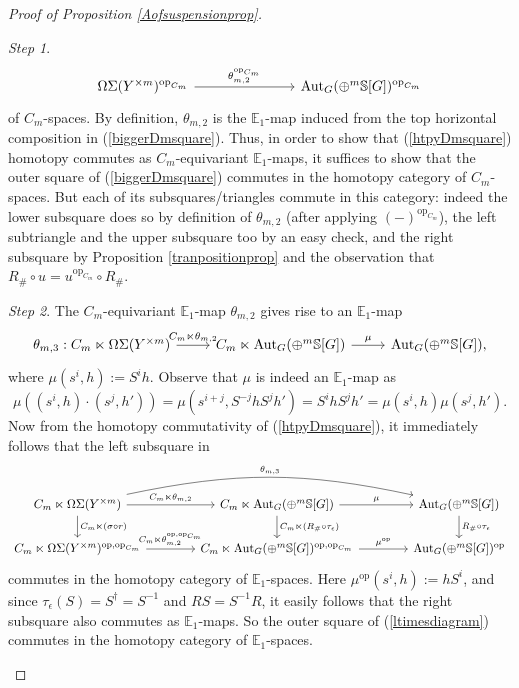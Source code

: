 \documentclass[a4paper, oneside]{amsart}
\newcommand{\1}{\mathds{1}}
\theoremstyle{remark}
\newtheorem{step}{Step}
\theoremstyle{definition}
\newcommand{\s}{\mathbb{S}}
\numberwithin{equation}{section}
\begin{document}
\begin{proof}[Proof of Proposition \ref{Aofsuspensionprop}]
\begin{step}
\begin{equation}
\begin{tikzcd}
\Omega\Sigma(Y^{\times m})^{\mathrm{op}_{C_m}}\ar[rrr, "\theta_{m,2}^{\mathrm{op}_{C_m}}"]&&& \mathrm{Aut}_G(\oplus^m\s[G])^{\mathrm{op}_{C_m}}
\end{tikzcd}
\end{equation}
of $C_m$-spaces. By definition, $\theta_{m,2}$ is the $\mathbb{E}_1$-map induced from the top horizontal composition in (\ref{biggerDmsquare}). Thus, in order to show that (\ref{htpyDmsquare}) homotopy commutes as $C_m$-equivariant $\mathbb{E}_1$-maps, it suffices to show that the outer square of (\ref{biggerDmsquare}) commutes in the homotopy category of $C_m$-spaces. But each of its subsquares/triangles commute in this category: indeed the lower subsquare does so by definition of $\theta_{m,2}$ (after applying $(-)^{\mathrm{op}_{C_m}}$), the left subtriangle and the upper subsquare too by an easy check, and the right subsquare by Proposition \ref{tranpositionprop} and the observation that $R_{\#}\circ u=u^{\mathrm{op}_{C_m}}\circ R_\#$.
\end{step}  


\begin{step}
The $C_m$-equivariant $\mathbb{E}_1$-map $\theta_{m,2}$ gives rise to an $\mathbb{E}_1$-map
$$
\begin{tikzcd}
\theta_{m,3}: C_m\ltimes \Omega\Sigma(Y^{\times m})\rar["C_m\ltimes \theta_{m,2}"] &C_m\ltimes \mathrm{Aut}_G(\oplus^m \s[G])\rar["\mu"]&\mathrm{Aut}_G(\oplus^m \s[G]),
\end{tikzcd}
$$
where $\mu(s^{i},h):=S^{i}h$. Observe that $\mu$ is indeed an $\mathbb{E}_1$-map as
$$
\mu((s^{i},h)\cdot (s^j,h'))=\mu(s^{i+j},S^{-j}h S^{j}h')=S^{i}hS^{j}h'=\mu(s^{i},h)\mu(s^j,h').
$$
Now from the homotopy commutativity of (\ref{htpyDmsquare}), it immediately follows that the left subsquare in
\begin{equation}\label{ltimesdiagram}
\begin{tikzcd}[column sep = 40pt]
C_m\ltimes \Omega\Sigma(Y^{\times m})\dar["C_m\ltimes (\sigma\circ r)"]\ar[rr,bend left=12pt, "\theta_{m,3}"] \rar["C_m\ltimes\theta_{m,2}"]&C_m\ltimes \mathrm{Aut}_G(\oplus^m\s[G])\dar["C_m\ltimes (R_\#\circ\tau_{\epsilon})"]\rar["\mu"]& \mathrm{Aut}_G(\oplus^m\s[G])\dar["R_{\#}\circ\tau_\epsilon"]\\
C_m\ltimes \Omega\Sigma(Y^{\times m})^{\mathrm{op},\mathrm{op}_{C_m}}\rar["C_m\ltimes \theta_{m,2}^{\mathrm{op},\mathrm{op}_{C_m}}"]&C_m\ltimes \mathrm{Aut}_G(\oplus^m\s[G])^{\mathrm{op},\mathrm{op}_{C_m}}\rar["\mu^{\mathrm{op}}"]&\mathrm{Aut}_G(\oplus^m\s[G])^{\mathrm{op}}
\end{tikzcd}
\end{equation}
commutes in the homotopy category of $\mathbb{E}_1$-spaces. Here $\mu^{\mathrm{op}}(s^{i},h):=hS^{i}$, and since $\tau_\epsilon(S)=S^{\dagger}=S^{-1}$ and $RS=S^{-1}R$, it easily follows that the right subsquare also commutes as $\mathbb{E}_1$-maps. So the outer square of (\ref{ltimesdiagram}) commutes in the homotopy category of $\mathbb{E}_1$-spaces. 


\end{step}
\end{proof}
\end{document}
